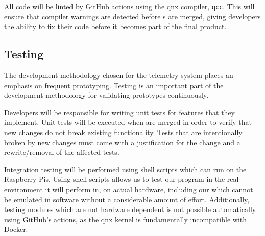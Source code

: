 All code will be linted by GitHub actions using the \gls{qnx} compiler, \texttt{qcc}. This will ensure that compiler
warnings are detected before s are merged, giving developers the ability to fix their code before it
becomes part of the final product.

\subsection{Testing}

The development methodology chosen for the telemetry system places an emphasis on frequent prototyping. Testing is an
important part of the development methodology for validating prototypes continuously.

Developers will be responsible for writing unit tests for features that they implement. Unit tests will be executed
when  are merged in order to verify that new changes do not break existing functionality. Tests that
are intentionally broken by new changes must come with a justification for the change and a rewrite/removal of the
affected tests.

Integration testing will be performed using shell scripts which can run on the Raspberry Pis. Using shell scripts
allows us to test our program in the real environment it will perform in, on actual hardware, including our
  which cannot be emulated in software without a considerable amount of effort.
Additionally, testing modules which are not hardware dependent is not possible automatically using GitHub's actions, as
the \gls{qnx}  kernel is fundamentally incompatible with Docker. \cite{docker-kernel-incompat}
